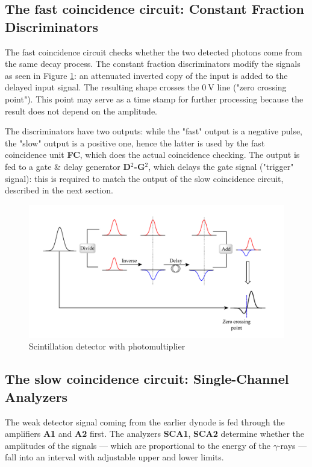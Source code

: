 \documentclass[twocolumn]{article}
\begin{document}
\subsection{The fast coincidence circuit: Constant Fraction Discriminators}
The fast coincidence circuit checks whether the two detected photons come from the same decay process. The constant fraction discriminators modify the signals as seen in Figure \ref{fig:cfd}: an attenuated inverted copy of the input is added to the delayed input signal. The resulting shape crosses the $\SI{0}{\volt}$ line ("zero crossing point"). This point may serve as a time stamp for further processing because the result does not depend on the amplitude.
\par The discriminators have two outputs: while the "fast" output is a negative pulse, the "slow" output is a positive one, hence the latter is used by the fast coincidence unit \textbf{FC}, which does the actual coincidence checking. The output is fed to a gate $\&$ delay generator \textbf{D$^2$-G$^2$}, which delays the gate signal ("trigger" signal): this is required to match the output of the slow coincidence circuit, described in the next section.
\begin{figure}[!h]
\centering
\includegraphics[width=1.1\linewidth]{cfd.png}
\caption{Scintillation detector with photomultiplier \cite{cfd}} 
\label{fig:cfd}
\end{figure}
\subsection{The slow coincidence circuit: Single-Channel Analyzers}
The weak detector signal coming from the earlier dynode is fed through the amplifiers \textbf{A1} and \textbf{A2} first. The analyzers \textbf{SCA1}, \textbf{SCA2} determine whether the amplitudes of the signals --- which are proportional to the energy of the $\gamma$-rays --- fall into an interval with adjustable upper and lower limits.
\end{document}
